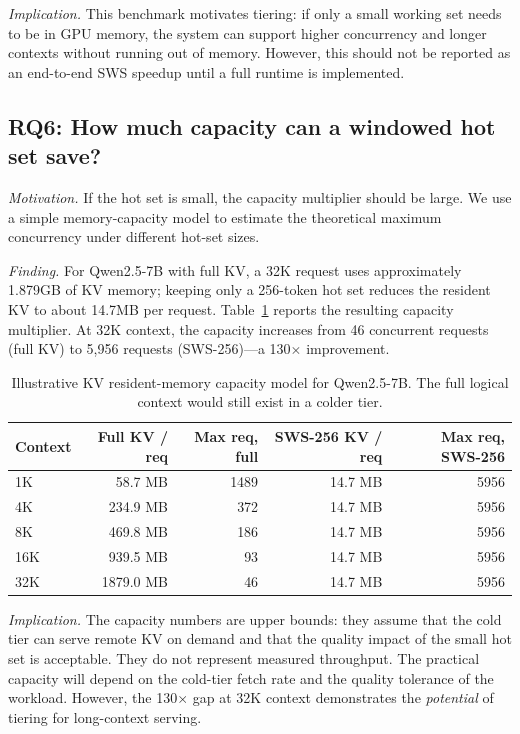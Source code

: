 \documentclass[11pt]{article}
\newcommand{\method}{SWS}
\theoremstyle{definition}
\theoremstyle{plain}
\begin{document}
\emph{Implication.}  This benchmark motivates tiering: if only a small working set needs to be in GPU memory, the system can support higher concurrency and longer contexts without running out of memory.  However, this should not be reported as an end-to-end \method{} speedup until a full runtime is implemented.

\subsection{RQ6: How much capacity can a windowed hot set save?}
\label{sec:rq6}

\emph{Motivation.}  If the hot set is small, the capacity multiplier should be large.  We use a simple memory-capacity model to estimate the theoretical maximum concurrency under different hot-set sizes.

\emph{Finding.}  For Qwen2.5-7B with full KV, a 32K request uses approximately 1.879GB of KV memory; keeping only a 256-token hot set reduces the resident KV to about 14.7MB per request.  Table~\ref{tab:capacity} reports the resulting capacity multiplier.  At 32K context, the capacity increases from 46 concurrent requests (full KV) to 5{,}956 requests (SWS-256)---a 130$\times$ improvement.

\begin{table}[t]
\centering
\caption{Illustrative KV resident-memory capacity model for Qwen2.5-7B.  The full logical context would still exist in a colder tier.}
\label{tab:capacity}
\small
\begin{tabular}{lrrrr}
\toprule
Context & Full KV / req & Max req, full & SWS-256 KV / req & Max req, SWS-256 \\
\midrule
1K & 58.7 MB & 1489 & 14.7 MB & 5956 \\
4K & 234.9 MB & 372 & 14.7 MB & 5956 \\
8K & 469.8 MB & 186 & 14.7 MB & 5956 \\
16K & 939.5 MB & 93 & 14.7 MB & 5956 \\
32K & 1879.0 MB & 46 & 14.7 MB & 5956 \\
\bottomrule
\end{tabular}
\end{table}

\emph{Implication.}  The capacity numbers are upper bounds: they assume that the cold tier can serve remote KV on demand and that the quality impact of the small hot set is acceptable.  They do not represent measured throughput.  The practical capacity will depend on the cold-tier fetch rate and the quality tolerance of the workload.  However, the 130$\times$ gap at 32K context demonstrates the \emph{potential} of tiering for long-context serving.
\end{document}
